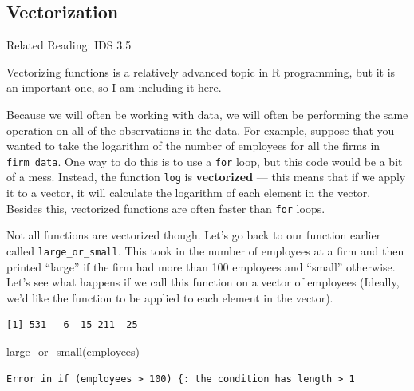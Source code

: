\documentclass[
  letterpaper,
  DIV=11,
  numbers=noendperiod]{scrreprt}
\newenvironment{Shaded}{\begin{snugshade}}{\end{snugshade}}
\newcommand{\FunctionTok}[1]{\textcolor[rgb]{0.28,0.35,0.67}{#1}}
\newcommand{\NormalTok}[1]{\textcolor[rgb]{0.00,0.23,0.31}{#1}}
\newcommand{\OtherTok}[1]{\textcolor[rgb]{0.00,0.23,0.31}{#1}}
\newcommand{\SpecialCharTok}[1]{\textcolor[rgb]{0.37,0.37,0.37}{#1}}
\begin{document}
\subsection{Vectorization}\label{vectorization}

Related Reading: IDS 3.5

Vectorizing functions is a relatively advanced topic in R programming,
but it is an important one, so I am including it here.

Because we will often be working with data, we will often be performing
the same operation on all of the observations in the data. For example,
suppose that you wanted to take the logarithm of the number of employees
for all the firms in \texttt{firm\_data}. One way to do this is to use a
\texttt{for} loop, but this code would be a bit of a mess. Instead, the
function \texttt{log} is \textbf{vectorized} --- this means that if we
apply it to a vector, it will calculate the logarithm of each element in
the vector. Besides this, vectorized functions are often faster than
\texttt{for} loops.

Not all functions are vectorized though. Let's go back to our function
earlier called \texttt{large\_or\_small}. This took in the number of
employees at a firm and then printed ``large'' if the firm had more than
100 employees and ``small'' otherwise. Let's see what happens if we call
this function on a vector of employees (Ideally, we'd like the function
to be applied to each element in the vector).

\begin{Shaded}
\end{Shaded}

\begin{verbatim}
[1] 531   6  15 211  25
\end{verbatim}

\begin{Shaded}
\begin{Highlighting}[]
\FunctionTok{large\_or\_small}\NormalTok{(employees)}
\end{Highlighting}
\end{Shaded}

\begin{verbatim}
Error in if (employees > 100) {: the condition has length > 1
\end{verbatim}
\end{document}
